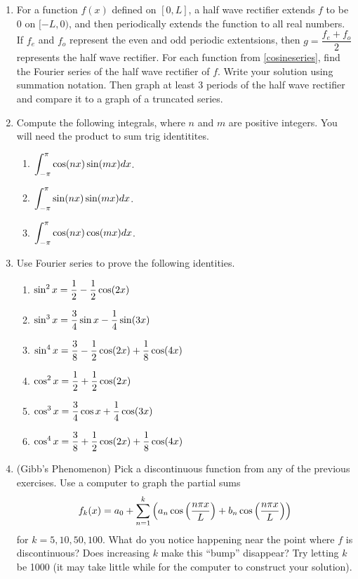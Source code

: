 \begin{enumerate}
	
	\item For a function $f(x)$ defined on $[0,L]$, a half wave rectifier extends $f$ to be $0$ on $[-L,0)$, and then periodically extends the function to all real numbers. If $f_e$ and $f_o$ represent the even and odd periodic extentsions, then $g=\dfrac{f_e+f_o}{2}$ represents the half wave rectifier. For each function from \ref{cosineseries}, find the Fourier series of the half wave rectifier of $f$. Write your solution using summation notation. Then graph at least 3 periods of the half wave rectifier and compare it to a graph of a truncated series. 

	\item Compute the following integrals, where $n$ and $m$ are positive integers. You will need the product to sum trig identitites.
	
\begin{enumerate}
	\item $\displaystyle \int_{-\pi}^{\pi} \cos(nx)\sin(mx)dx$.
	\item $\displaystyle \int_{-\pi}^{\pi} \sin(nx)\sin(mx)dx$.
	\item $\displaystyle \int_{-\pi}^{\pi} \cos(nx)\cos(mx)dx$.	
\end{enumerate}


\item Use Fourier series to prove the following identities.
\begin{multicols}{2}
\begin{enumerate}
	\item $\displaystyle \sin^2x = \frac12 -\frac12 \cos(2x)$
	\item $\displaystyle \sin^3x = \frac34\sin x -\frac14 \sin(3x)$
	\item $\displaystyle \sin^4x = \frac38-\frac12\cos(2x) +\frac18 \cos(4x)$
	\item $\displaystyle \cos^2x = \frac12 +\frac12 \cos(2x)$
	\item $\displaystyle \cos^3x = \frac34\cos x +\frac14 \cos(3x)$
	\item $\displaystyle \cos^4x = \frac38+\frac12\cos(2x) +\frac18 \cos(4x)$
\end{enumerate}
\end{multicols}

\item (Gibb's Phenomenon) Pick a discontinuous function from any of the previous exercises. Use a computer to graph the partial sums $$f_k(x) = \displaystyle a_0+\sum_{n=1}^k \left( a_n\cos\left(\frac{n\pi x}{L}\right) + b_n\cos\left(\frac{n\pi x}{L}\right)\right)$$ for $k=5,10,50,100$. What do you notice happening near the point where $f$ is discontinuous?  Does increasing $k$ make this ``bump'' disappear? Try letting $k$ be 1000 (it may take little while for the computer to construct your solution). 

\end{enumerate}


\restoregeometry

